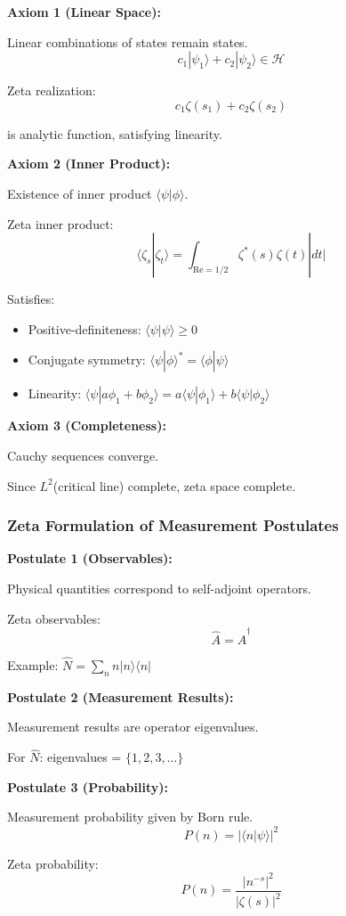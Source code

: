 \documentclass[11pt]{article}
\theoremstyle{plain}
\theoremstyle{definition}
\theoremstyle{remark}
\begin{document}
\textbf{Axiom 1 (Linear Space):}

Linear combinations of states remain states.
$$c_1|\psi_1\rangle + c_2|\psi_2\rangle \in \mathcal{H}$$

Zeta realization:
$$c_1 \zeta(s_1) + c_2 \zeta(s_2)$$

is analytic function, satisfying linearity.

\textbf{Axiom 2 (Inner Product):}

Existence of inner product $\langle\psi|\phi\rangle$.

Zeta inner product:
$$\langle \zeta_s | \zeta_t \rangle = \int_{\text{Re}=1/2} \zeta^*(s) \zeta(t) |dt|$$

Satisfies:
\begin{itemize}
\item Positive-definiteness: $\langle\psi|\psi\rangle \geq 0$
\item Conjugate symmetry: $\langle\psi|\phi\rangle^* = \langle\phi|\psi\rangle$
\item Linearity: $\langle\psi|a\phi_1 + b\phi_2\rangle = a\langle\psi|\phi_1\rangle + b\langle\psi|\phi_2\rangle$
\end{itemize}

\textbf{Axiom 3 (Completeness):}

Cauchy sequences converge.

Since $L^2$(critical line) complete, zeta space complete.

\subsubsection{Zeta Formulation of Measurement Postulates}

\textbf{Postulate 1 (Observables):}

Physical quantities correspond to self-adjoint operators.

Zeta observables:
$$\hat{A} = \hat{A}^\dagger$$

Example: $\hat{N} = \sum_n n|n\rangle\langle n|$

\textbf{Postulate 2 (Measurement Results):}

Measurement results are operator eigenvalues.

For $\hat{N}$: eigenvalues = $\{1, 2, 3, \ldots\}$

\textbf{Postulate 3 (Probability):}

Measurement probability given by Born rule.
$$P(n) = |\langle n|\psi\rangle|^2$$

Zeta probability:
$$P(n) = \frac{|n^{-s}|^2}{|\zeta(s)|^2}$$
\end{document}
